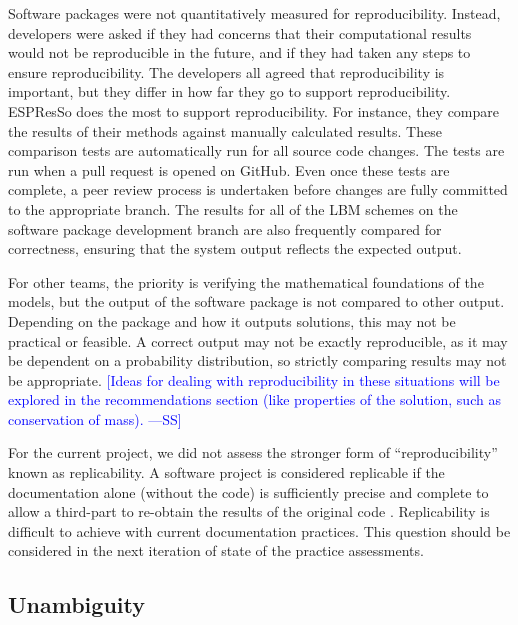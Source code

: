 \documentclass[final, 3p, times, authoryear]{elsarticle}
\newcommand{\authornote}[3]{\textcolor{#1}{[#3 ---#2]}}
\newcommand{\authornote}[3]{}
\newcommand{\wss}[1]{\authornote{blue}{SS}{#1}} %
\begin{document}
Software packages were not quantitatively measured for reproducibility. Instead,
developers were asked if they had concerns that their computational results
would not be reproducible in the future, and if they had taken any steps to
ensure reproducibility.  The developers all agreed that reproducibility is
important, but they differ in how far they go to support reproducibility.
ESPResSo does the most to support reproducibility.  For instance, they compare
the results of their methods against manually calculated results. These
comparison tests are automatically run for all source code changes. The tests
are run when a pull request is opened on GitHub. Even once these tests are
complete, a peer review process is undertaken before changes are fully committed
to the appropriate branch. The results for all of the LBM schemes on the
software package development branch are also frequently compared for
correctness, ensuring that the system output reflects the expected output.  

For other teams, the priority is verifying the mathematical foundations of the
models, but the output of the software package is not compared to other output.
Depending on the package and how it outputs solutions, this may not be practical
or feasible. A correct output may not be exactly reproducible, as it may be
dependent on a probability distribution, so strictly comparing results may not
be appropriate. \wss{Ideas for dealing with reproducibility in these situations
will be explored in the recommendations section (like properties of the solution,
such as conservation of mass).}

For the current project, we did not assess the stronger form of
``reproducibility'' known as replicability.  A software project is considered
replicable if the documentation alone (without the code) is sufficiently precise
and complete to allow a third-part to re-obtain the results of the original code
\citep{BenureauAndRougier2017}.  Replicability is difficult to achieve with
current documentation practices.  This question should be considered in the next
iteration of state of the practice assessments. 

\subsection{Unambiguity}
\end{document}
